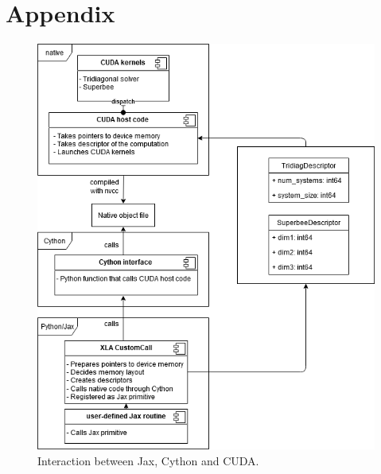 \documentclass[a4paper,oneside]{memoir}
\begin{document}
\section{Appendix}
\begin{figure}[h]
    \centering
    \includegraphics[width=\textwidth]{integration.png}
    \caption{Interaction between Jax, Cython and CUDA.}
    \label{fig:integration}
\end{figure}




\end{document}
